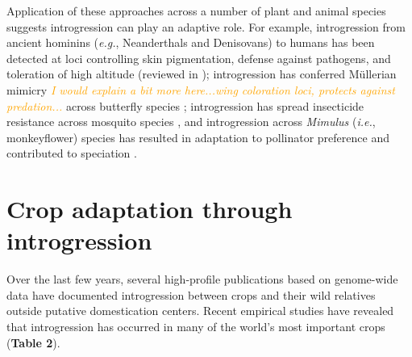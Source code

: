 \documentclass[11pt]{article}
\newcommand{\mbh}[1]{\textcolor{orange}{ \emph{\scriptsize  #1}} } %
\begin{document}
Application of these approaches across a number of plant and animal species suggests introgression can play an adaptive role. For example, introgression from ancient hominins (\emph{e.g.}, Neanderthals and Denisovans) to humans has been detected at loci controlling skin pigmentation, defense against pathogens, and toleration of high altitude (reviewed in \cite{Racimo2015}); introgression has conferred M\"{u}llerian mimicry \mbh{I would explain a bit more here...wing coloration loci, protects against predation...} across butterfly species \cite{Heliconius2012}; introgression has spread insecticide resistance across mosquito species \cite{Norris2015}, and introgression across \emph{Mimulus} (\emph{i.e.}, monkeyflower) species has resulted in adaptation to pollinator preference and contributed to speciation \cite{Stankowski2015}.






\section*{Crop adaptation through introgression}


Over the last few years, several high-profile publications based on genome-wide data have documented introgression between crops and their wild relatives outside putative domestication centers.
Recent empirical studies have revealed that introgression has occurred in many of the world's most important crops (\textbf{Table 2}).
\end{document}
